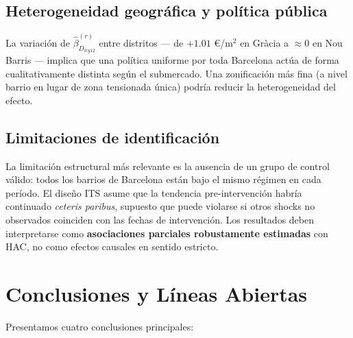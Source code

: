 \documentclass[10pt,a4paper,twocolumn]{article}
\begin{document}
\subsection{Heterogeneidad geográfica y política pública}

La variación de $\hat{\beta}_{D_{ley12}}^{(r)}$ entre distritos --- de $+1.01$
\euro/m$^2$ en Gràcia a $\approx 0$ en Nou Barris --- implica que una política
uniforme por toda Barcelona actúa de forma cualitativamente distinta según el submercado.
Una zonificación más fina (a nivel barrio en lugar de zona tensionada única) podría
reducir la heterogeneidad del efecto.

\subsection{Limitaciones de identificación}

La limitación estructural más relevante es la ausencia de un grupo de control válido:
todos los barrios de Barcelona están bajo el mismo régimen en cada período. El diseño
ITS asume que la tendencia pre-intervención habría continuado \textit{ceteris paribus},
supuesto que puede violarse si otros shocks no observados coinciden con las fechas de
intervención. Los resultados deben interpretarse como \textbf{asociaciones parciales
robustamente estimadas} con HAC, no como efectos causales en sentido estricto.

\section{Conclusiones y Líneas Abiertas}
\label{sec:conclusiones}

Presentamos cuatro conclusiones principales:
\end{document}
